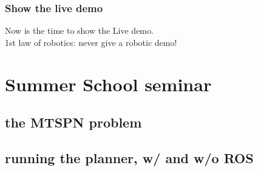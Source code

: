 \documentclass[aspectratio=1610]{beamer}
\begin{document}
  \begin{frame}
    \frametitle{Show the live demo}

    \begin{center}
      \large Now is the time to show the Live demo.\\
      \vspace{2em}
      1st law of robotics: never give a robotic demo!
    \end{center}

  \end{frame}


  \section{Summer School seminar}
  \subsection{the MTSPN problem}
  \subsection{running the planner, w/ and w/o ROS}

\end{document}
